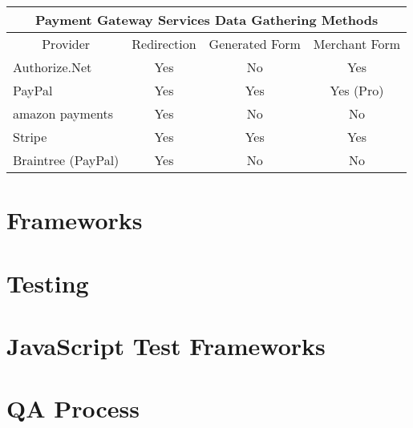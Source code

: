 \centering
\begin{tabular}{ |p{3.5cm}|p{1.75cm}|p{2cm}|p{2cm}|  } 
 \hline
 	\multicolumn{4}{|c|}{Payment Gateway Services Data Gathering Methods} \\
 \hline
 	\multicolumn{1}{|c|}{Provider} & 
 	\multicolumn{1}{|c|}{Redirection} & 
 	\multicolumn{1}{|c|}{Generated Form} & 
 	\multicolumn{1}{|c|}{Merchant Form}  \\
 \hline
 	Authorize.Net\cite{authorize-net} & \multicolumn{1}{|c|}{Yes} & \multicolumn{1}{|c|}{No} & \multicolumn{1}{|c|}{Yes} \\
 \hline
 	PayPal\cite{paypal} & \multicolumn{1}{|c|}{Yes} & \multicolumn{1}{|c|}{Yes} & \multicolumn{1}{|c|}{Yes (Pro)} \\
 \hline
 	amazon payments\cite{amazon-payments} & \multicolumn{1}{|c|}{Yes} & \multicolumn{1}{|c|}{No} & \multicolumn{1}{|c|}{No} \\
 \hline
    Stripe\cite{stripe} & \multicolumn{1}{|c|}{Yes} & \multicolumn{1}{|c|}{Yes} & \multicolumn{1}{|c|}{Yes} \\
 \hline
 	Braintree (PayPal)\cite{braintree} & \multicolumn{1}{|c|}{Yes} & \multicolumn{1}{|c|}{No} & \multicolumn{1}{|c|}{No} \\
 \hline
\end{tabular}
\label{tab:gateway-providers} 
\vspace{0.4cm}

\section{Frameworks}
\label{sec:frameworks}

\section{Testing}
\label{sec:testing}

\section{JavaScript Test Frameworks}
\label{sec:frameworks}

\section{QA Process}
\label{sec:qa-process}
